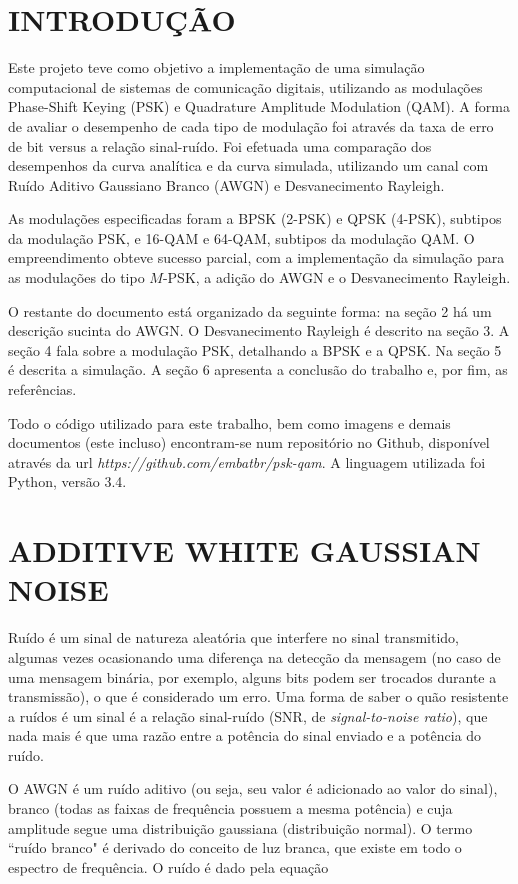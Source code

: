 \documentclass[a4paper,twocolumn]{article}
\begin{document}
\section{INTRODUÇÃO}

Este projeto teve como objetivo a implementação de uma simulação computacional de sistemas de comunicação digitais, utilizando as modulações Phase-Shift Keying (PSK) e Quadrature Amplitude Modulation (QAM). A forma de avaliar o desempenho de cada tipo de modulação foi através da taxa de erro de bit versus a relação sinal-ruído. Foi efetuada uma comparação dos desempenhos da curva analítica e da curva simulada, utilizando um canal com Ruído Aditivo Gaussiano Branco (AWGN) e Desvanecimento Rayleigh.

As modulações especificadas foram a BPSK (2-PSK) e QPSK (4-PSK), subtipos da modulação PSK, e 16-QAM e 64-QAM, subtipos da modulação QAM. O empreendimento obteve sucesso parcial, com a implementação da simulação para as modulações do tipo $M$-PSK, a adição do AWGN e o Desvanecimento Rayleigh.

O restante do documento está organizado da seguinte forma: na seção 2 há um descrição sucinta do AWGN. O Desvanecimento Rayleigh é descrito na seção 3. A seção 4 fala sobre a modulação PSK, detalhando a BPSK e a QPSK. Na seção 5 é descrita a simulação. A seção 6 apresenta a conclusão do trabalho e, por fim, as referências.

Todo o código utilizado para este trabalho, bem como imagens e demais documentos (este incluso) encontram-se num repositório no Github, disponível através da url \textit{https://github.com/embatbr/psk-qam}. A linguagem utilizada foi Python, versão 3.4.


\section{ADDITIVE WHITE GAUSSIAN NOISE}

Ruído é um sinal de natureza aleatória que interfere no sinal transmitido, algumas vezes ocasionando uma diferença na detecção da mensagem (no caso de uma mensagem binária, por exemplo, alguns bits podem ser trocados durante a transmissão), o que é considerado um erro. Uma forma de saber o quão resistente a ruídos é um sinal é a relação sinal-ruído (SNR, de \textit{signal-to-noise ratio}), que nada mais é que uma razão entre a potência do sinal enviado e a potência do ruído.

O AWGN é um ruído aditivo (ou seja, seu valor é adicionado ao valor do sinal), branco (todas as faixas de frequência possuem a mesma potência) e cuja amplitude segue uma distribuição gaussiana (distribuição normal). O termo ``ruído branco" é derivado do conceito de luz branca, que existe em todo o espectro de frequência. O ruído é dado pela equação
\end{document}
